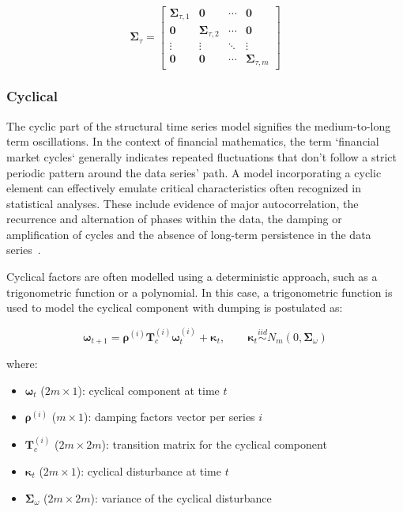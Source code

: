    \begin{equation}
        \bm{\Sigma}_{\tau} =
            \left[
                \begin{array}{cccc}
                    \mathbf{\Sigma}_{\tau, 1} & \mathbf{0}                 & \cdots & \mathbf{0} \\
                    \mathbf{0}                & \mathbf{\Sigma}_{\tau, 2}  & \cdots & \mathbf{0} \\
                    \vdots                    & \vdots                     & \ddots & \vdots     \\
                    \mathbf{0}                & \mathbf{0}                 & \cdots & \mathbf{\Sigma}_{\tau, m}
                \end{array}
            \right]
    \label{eq:seasonal_covariance}
    \end{equation}

\subsubsection{Cyclical}
    \label{sec:cyclical_component}

    The cyclic part of the structural time series model signifies the medium-to-long term oscillations.
    In the context of financial mathematics, the term `financial market cycles` generally indicates repeated fluctuations
    that don't follow a strict periodic pattern around the data series' path.
    A model incorporating a cyclic element can effectively emulate critical characteristics often recognized in statistical analyses.
    These include evidence of major autocorrelation, the recurrence and alternation of phases within the data,
    the damping or amplification of cycles and the absence of long-term persistence in the data series~\cite{qiu_multivariate_2018}.

    Cyclical factors are often modelled using a deterministic approach, such as a trigonometric function or a polynomial.
    In this case, a trigonometric function is used to model the cyclical component with dumping is postulated as:

    \begin{equation}
        \bm{\omega}_{t+1} = \bm{\rho}^{(i)} \bm{T}_c^{(i)} \bm{\omega}_{t}^{(i)} + \bm{\kappa}_{t},
            \qquad \bm{\kappa}_{t} \stackrel{\textit{iid}}{\sim} N_{m}(0, \bm{\Sigma}_{\omega})
        \label{eq:cyclical_state}
    \end{equation}

    where:
    \begin{itemize}
        \item $\bm{\omega}_{t}$ ($2m \times 1$): cyclical component at time $t$
        \item $\bm{\rho}^{(i)}$ ($m \times 1$): damping factors vector per series $i$
        \item $\bm{T}_c^{(i)}$ ($2m \times 2m$): transition matrix for the cyclical component
        \item $\bm{\kappa}_{t}$ ($2m \times 1$): cyclical disturbance at time $t$
        \item $\bm{\Sigma}_{\omega}$ ($2m \times 2m$): variance of the cyclical disturbance
    \end{itemize}

